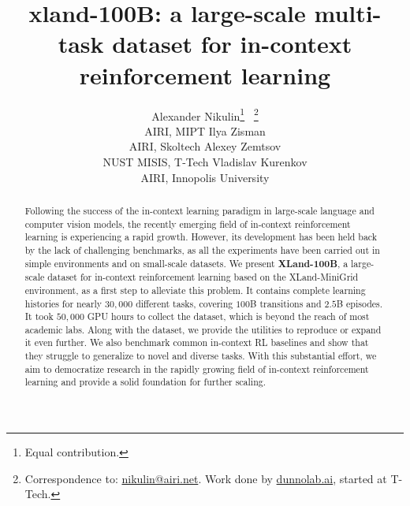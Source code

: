 \documentclass{article}
\title{xland-100B: a large-scale multi-task dataset for in-context reinforcement learning}
\author{
Alexander Nikulin\thanks{Equal contribution.} \ \thanks{Correspondence to: \href{mailto:nikulin@airi.net}{nikulin@airi.net}. Work done by \href{https://dunnolab.ai}{dunnolab.ai}, started at T-Tech.} \\
AIRI, MIPT
\And
Ilya Zisman\footnotemark[1] \\
AIRI, Skoltech
\And
Alexey Zemtsov\footnotemark[1] \\
NUST MISIS, T-Tech
\And
Vladislav Kurenkov \\
AIRI, Innopolis University
}
\begin{document}
\maketitle
\begin{abstract}
Following the success of the in-context learning paradigm in large-scale language and computer vision models, the recently emerging field of in-context reinforcement learning is experiencing a rapid growth. However, its development has been held back by the lack of challenging benchmarks, as all the experiments have been carried out in simple environments and on small-scale datasets. We present \textbf{XLand-100B}, a large-scale dataset for in-context reinforcement learning based on the XLand-MiniGrid environment, as a first step to alleviate this problem. It contains complete learning histories for nearly $30,000$ different tasks, covering $100$B transitions and $2.5$B episodes. It took $50,000$ GPU hours to collect the dataset, which is beyond the reach of most academic labs. Along with the dataset, we provide the utilities to reproduce or expand it even further. We also benchmark common in-context RL baselines and show that they struggle to generalize to novel and diverse tasks. With this substantial effort, we aim to democratize research in the rapidly growing field of in-context reinforcement learning and provide a solid foundation for further scaling.
\end{abstract}
\end{document}
